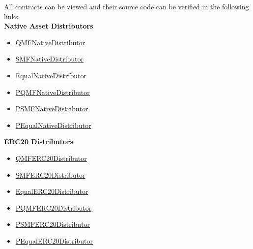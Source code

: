 \documentclass[a4paper,12pt]{report}
\begin{document}
All contracts can be viewed and their source code can be verified in the following links:
\\
\textbf{Native Asset Distributors}
\begin{itemize}
	\item \href{https://testnet.snowtrace.io/address/0xf3511AC9c42b52D2728722DFE14486E849897b83}{QMFNativeDistributor}
	\item \href{https://testnet.snowtrace.io/address/0x080f7c0aa98e4ef3f3fa441cf8728277932f8f92}{SMFNativeDistributor}
	\item \href{https://testnet.snowtrace.io/address/0x8926df2df0bb310d978961c76375b936b4b3c1e2}{EqualNativeDistributor}
	\item \href{https://testnet.snowtrace.io/address/0x5feEAB0162c5aFFB98E7c346f33B9FC18777F3cA}{PQMFNativeDistributor}
	\item \href{https://testnet.snowtrace.io/address/0x5842c0814EbA6eECB9c8B61ff58C077B20eF46b1}{PSMFNativeDistributor}
	\item \href{https://testnet.snowtrace.io/address/0xD136D5138c87CCD300fB88692616db7bf50E24c1}{PEqualNativeDistributor}
\end{itemize}

\newpage

\textbf{ERC20 Distributors}
\begin{itemize}
	\item \href{https://testnet.snowtrace.io/address/0x960E76607E554ef13e95Bb02316D7e45e62b9CA6}{QMFERC20Distributor}
	\item \href{https://testnet.snowtrace.io/address/0xCd6FecCE500548D7e01bC0bD343ee25Bc99b6a18}{SMFERC20Distributor}
	\item \href{https://testnet.snowtrace.io/address/0xe21C63cC67eb20Ce187f1E9C1B853E23CA47e539}{EqualERC20Distributor}
	\item \href{https://testnet.snowtrace.io/address/0xbd8fC81BfF7a73618abafF6e2812541F8f1a7186}{PQMFERC20Distributor}
	\item \href{https://testnet.snowtrace.io/address/0xEbd643f47D669FBC427C102f981E6EC9E87e99de}{PSMFERC20Distributor}
	\item \href{https://testnet.snowtrace.io/address/0xB64a91bc12dB15B98ab002Cc628165842A1a0193}{PEqualERC20Distributor}
\end{itemize}
\end{document}
